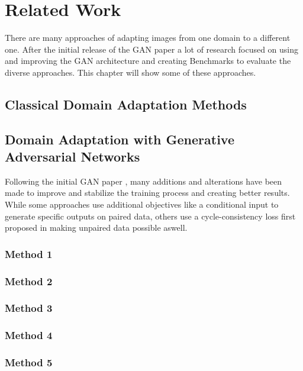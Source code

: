 \chapter{Related Work}
\label{sec:related_work}

There are many approaches of adapting images from one domain to a different one. After the initial release of the GAN paper \cite{NIPS2014_5423} a lot of research focused on using and improving the GAN architecture and creating Benchmarks to evaluate the diverse approaches. This chapter will show some of these approaches.

\section{Classical Domain Adaptation Methods}


\section{Domain Adaptation with Generative Adversarial Networks}
Following the initial GAN paper \cite{NIPS2014_5423}, many additions and alterations have been made to improve and stabilize the training process and creating better results. While some approaches use additional objectives like a conditional input to generate specific outputs \cite{DBLP:journals/corr/IsolaZZE16} on paired data, others use a cycle-consistency loss first proposed in \cite{DBLP:journals/corr/ZhuPIE17} making unpaired data possible aswell. 


\subsection{Method 1}

\subsection{Method 2}

\subsection{Method 3}

\subsection{Method 4}

\subsection{Method 5}